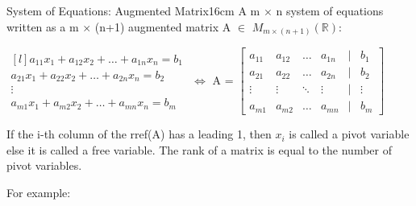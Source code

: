    \begin{definition}{System of Equations: Augmented Matrix}{16cm}
        A m $\times$ n system of equations written as a
        m $\times$ (n+1) {\color{lblue} augmented matrix}
        A $\in$ $M_{m \times (n+1)}(\mathbb{R})$:

        \hspace{0.5cm}
        $\begin{matrix*}[l]
            a_{11}x_1 + a_{12}x_2 + \hdots + a_{1n}x_n = b_1 \\
            a_{21}x_1 + a_{22}x_2 + \hdots + a_{2n}x_n = b_2 \\
            \vdots \\
            a_{m1}x_1 + a_{m2}x_2 + \hdots + a_{mn}x_n = b_m
        \end{matrix*}$
        \hspace{0.5cm}
        $\Leftrightarrow$
        \hspace{0.5cm}
        A = 
        $\begin{bmatrix}
            a_{11} & a_{12} & \hdots & a_{1n} & | & b_1 \\
            a_{21} & a_{22} & \hdots & a_{2n} & | & b_2 \\
            \vdots & \vdots & \ddots & \vdots & | & \vdots \\
            a_{m1} & a_{m2} & \hdots & a_{mn} & | & b_m
        \end{bmatrix}$ 

        If the i-th column of the rref(A) has a leading 1, then $x_i$ is called
        a {\color{lblue} pivot variable} else it is called a
        {\color{lblue} free variable}. The {\color{lblue} rank}
        of a matrix is equal to the number of pivot variables.
        
        For example:


\end{definition}
